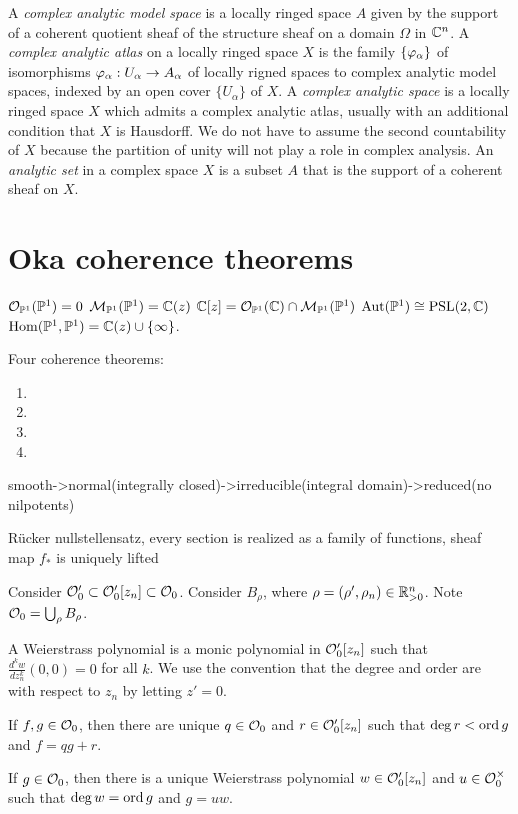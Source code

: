 \documentclass{../../large}
\begin{document}
\begin{prb}
A \emph{complex analytic model space} is a locally ringed space $A$ given by the support of a coherent quotient sheaf of the structure sheaf on a domain $\Omega$ in $\mathbb{C}^n$.
A \emph{complex analytic atlas} on a locally ringed space $X$ is the family $\{\varphi_\alpha\}$ of isomorphisms $\varphi_\alpha:U_\alpha\to A_\alpha$ of locally rigned spaces to complex analytic model spaces, indexed by an open cover $\{U_\alpha\}$ of $X$.
A \emph{complex analytic space} is a locally ringed space $X$ which admits a complex analytic atlas, usually with an additional condition that $X$ is Hausdorff.
We do not have to assume the second countability of $X$ because the partition of unity will not play a role in complex analysis.
An \emph{analytic set} in a complex space $X$ is a subset $A$ that is the support of a coherent sheaf on $X$.
\end{prb}




\section{Oka coherence theorems}

$\mathcal{O}_{\mathbb{P}^1}(\mathbb{P}^1)=0$
$\mathcal{M}_{\mathbb{P}^1}(\mathbb{P}^1)=\mathbb{C}(z)$
$\mathbb{C}[z]=\mathcal{O}_{\mathbb{P}^1}(\mathbb{C})\cap\mathcal{M}_{\mathbb{P}^1}(\mathbb{P}^1)$
$\operatorname{Aut}(\mathbb{P}^1)\cong\mathrm{PSL}(2,\mathbb{C})$
$\operatorname{Hom}(\mathbb{P}^1,\mathbb{P}^1)=\mathbb{C}(z)\cup\{\infty\}$.



Four coherence theorems:
\begin{enumerate}
\item 
\item
\item
\item
\end{enumerate}

\begin{prb}
smooth->normal(integrally closed)->irreducible(integral domain)->reduced(no nilpotents)
\end{prb}

\begin{prb}
R\"ucker nullstellensatz,
every section is realized as a family of functions,
sheaf map $f_*$ is uniquely lifted
\end{prb}

\begin{prb}
Consider $\mathcal{O}'_0\subset\mathcal{O}'_0[z_n]\subset\mathcal{O}_0$.
Consider $B_\rho$, where $\rho=(\rho',\rho_n)\in\mathbb{R}_{>0}^n$.
Note $\mathcal{O}_0=\bigcup_\rho B_\rho$.

A Weierstrass polynomial is a monic polynomial in $\mathcal{O}'_0[z_n]$ such that $\frac{d^kw}{dz_n^k}(0,0)=0$ for all $k$.
We use the convention that the degree and order are with respect to $z_n$ by letting $z'=0$.
\begin{parts}
\item If $f,g\in\mathcal{O}_0$, then there are unique $q\in\mathcal{O}_0$ and $r\in\mathcal{O}'_0[z_n]$ such that $\deg r<\operatorname{ord} g$ and $f=qg+r$.
\item If $g\in\mathcal{O}_0$, then there is a unique Weierstrass polynomial $w\in\mathcal{O}'_0[z_n]$ and $u\in\mathcal{O}_0^\times$ such that $\deg w=\operatorname{ord} g$ and $g=uw$.
\end{parts}
\end{prb}
\end{document}
